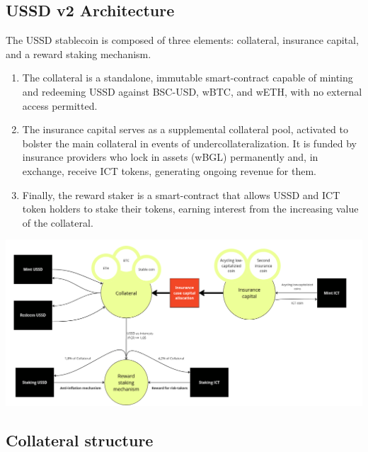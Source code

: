 \subsection{USSD v2 Architecture}

The USSD stablecoin is composed of three elements: collateral, insurance capital, and a reward staking mechanism. 
\begin{enumerate}
    \item The collateral is a standalone, immutable smart-contract capable of minting and redeeming USSD against BSC-USD, wBTC, and wETH, with no external access permitted. 
    \item The insurance capital serves as a supplemental collateral pool, activated to bolster the main collateral in events of undercollateralization. It is funded by insurance providers who lock in assets (wBGL) permanently and, in exchange, receive ICT tokens, generating ongoing revenue for them. 
    \item Finally, the reward staker is a smart-contract that allows USSD and ICT token holders to stake their tokens, earning interest from the increasing value of the collateral.
\end{enumerate}

\centerline{\includegraphics[scale=0.45]{image01.png}}

\subsection{Collateral structure}

